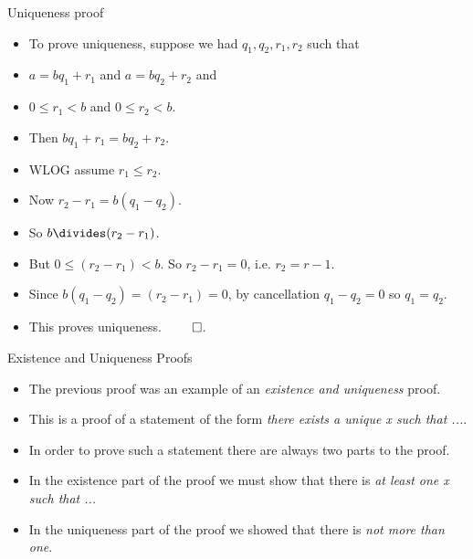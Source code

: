 \documentclass{beamer}
\begin{document}
\begin{frame}{Uniqueness proof}


\begin{itemize}
  \item To prove uniqueness, suppose we had $q_1, q_2, r_1, r_2$ such that
  \item $a = b q_1 + r_1$ and $a = b q_2 + r_2$ and
  \item $0\leq r_1 < b$ and $0 \leq r_2 < b$.
  \item Then $b q_1 + r_1 = b q_2 + r_2$.
  \item WLOG assume $r_1 \leq r_2$.
  \item Now $r_2 - r_1 = b (q_1 - q_2)$.
  \item So $b \divides (r_2 - r_1)$.
  \item But $0\leq (r_2 - r_1) < b$. So $r_2 - r_1 = 0$, i.e. $r_2 = r-1$.
  \item Since $b (q_1 - q_2) = (r_2 - r_1) = 0$, by cancellation $q_1 - q_2 = 0$ so $q_1 = q_2$.
  \item This proves uniqueness. $\qed$.
\end{itemize}

\end{frame}

\begin{frame}{Existence and Uniqueness Proofs}


\begin{itemize}
  \item The previous proof was an example of an \emph{existence and uniqueness} proof.
  \item This is a proof of a statement of the form \emph{there exists a unique x such that ...}.
  \item In order to prove such a statement there are always two parts to the proof.
  \item In the existence part of the proof we must show that there is \emph{at least one x such that ...}
  \item In the uniqueness part of the proof we showed that there is \emph{not more than one}.
\end{itemize}

\end{frame}
\end{document}
